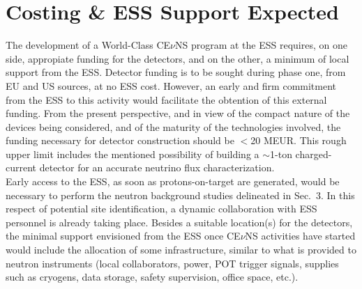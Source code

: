 

\section{Costing \& ESS Support Expected}

The development of a World-Class CE$\nu$NS program at the ESS requires, on one side, appropiate funding for the detectors, and on the other, a minimum of local support from the ESS.  Detector funding is to be sought during phase one, from EU and US sources, at no ESS cost. However, an early and firm commitment from the ESS to this activity would facilitate the obtention of this external funding. From the present perspective, and in view of the compact nature of the devices being considered, and of the maturity of the technologies involved, the funding necessary for detector construction should be  $<$20 MEUR. This rough upper limit includes the mentioned possibility of building a $\sim$1-ton charged-current detector for an accurate neutrino flux characterization.\\

Early access to the ESS, as soon as protons-on-target are generated, would be necessary  to perform the neutron background studies delineated in Sec.\ 3. In this respect of potential site identification,  a dynamic collaboration with ESS personnel is already taking place. Besides a suitable location(s) for the detectors, the minimal support envisioned from the ESS once CE$\nu$NS activities have started would include the allocation of some infrastructure, similar to what is provided to neutron instruments (local collaborators, power, POT trigger signals, supplies such as cryogens, data storage, safety supervision, office space, etc.).

